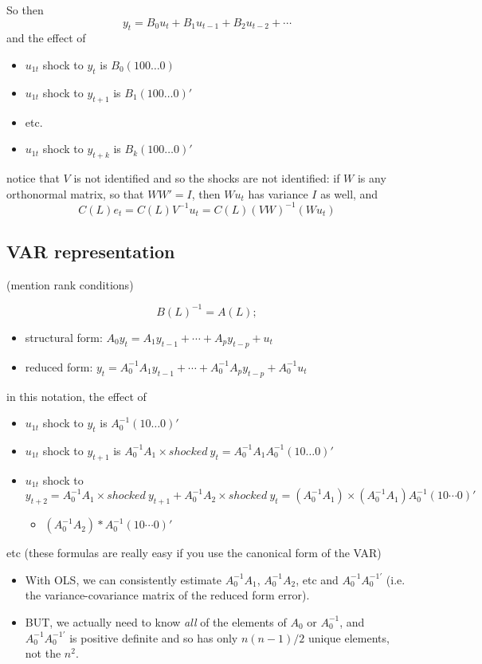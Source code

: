 So then
\[y_t = B_0 u_t + B_1 u_{t-1} + B_2 u_{t-2} + ⋯\]
and the effect of
\begin{itemize}
\item $u_{1t}$ shock to $y_t$ is $B_0 (1 0 0 … 0)$
\item $u_{1t}$ shock to $y_{t+1}$ is $B_1 (1 0 0 … 0)'$
\item etc.
\item $u_{1t}$ shock to $y_{t+k}$ is $B_k (1 0 0 … 0)'$
\end{itemize}
notice that $V$ is not identified and so the shocks are not identified:
if $W$ is any orthonormal matrix, so that $W W' = I$, then $W u_t$ has
variance $I$ as well, and
\[C(L) e_t = C(L) V^{-1} u_t = C(L) (VW)^{-1} ( W u_t )\]

\subsection{VAR representation}

(mention rank conditions)

\[B(L)^{-1} = A(L);\]
\begin{itemize}
\item structural form: $A_0 y_t = A_1 y_{t-1} + ⋯ + A_p y_{t-p} + u_t$
\item reduced form: $y_t = A_0^{-1} A_1 y_{t-1} + ⋯ + A_0^{-1} A_p
  y_{t-p} + A_0^{-1} u_t$
\end{itemize}
in this notation, the effect of
\begin{itemize}
\item $u_{1t}$ shock to $y_t$ is $A_0^{-1} (1 0 … 0)'$
\item $u_{1t}$ shock to $y_{t+1}$ is $A_0^{-1} A_1 × shocked\ y_t =
  A_0^{-1} A_1 A_0^{-1} (1 0 … 0)'$
\item $u_{1t}$ shock to $y_{t+2} = A_0^{-1} A_1 × shocked\ y_{t+1} +
  A_0^{-1} A_2 × shocked\ y_t = (A_0^{-1} A_1) × (A_0^{-1} A_1)
  A_0^{-1} (1 0 ⋯ 0)'$
  \begin{itemize}
  \item $(A_0^{-1} A_2) * A_0^{-1} (1 0 ⋯ 0)'$
  \end{itemize}
\end{itemize}
etc (these formulas are really easy if you use the canonical form of
the VAR)

\begin{itemize}
\item With OLS, we can consistently estimate $A_0^{-1} A_1$, $A_0^{-1}
  A_2$, etc and $A_0^{-1} A_0^{-1\prime}$ (i.e. the variance-covariance
  matrix of the reduced form error).
\item BUT, we actually need to know \emph{all} of the elements of
  $A_0$ or $A_0^{-1}$, and $A_0^{-1} A_0^{-1\prime}$ is positive definite
  and so has only $n (n-1) / 2$ unique elements, not the $n^2$.
\end{itemize}

